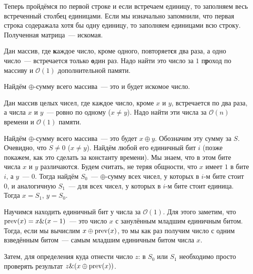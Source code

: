 \documentclass[addpoints]{exam}
\begin{document}
\begin{questions}
\begin{solution}
\begin{enumerate}
\end{enumerate}

Теперь пройдёмся по первой строке и если встречаем единицу, то заполняем весь встреченный столбец единицами. Если мы изначально запомнили, что первая строка содеражала хотя бы одну единицу, то заполняем единицами всю строку. Полученная матрица~--- искомая.

\end{solution}

\question[\half] Дан массив, где \textbf{к}аждое число, кроме одного, повторяет\textbf{с}я два раза, а одно число~--- встречается только \textbf{о}дин раз. Надо найти это число за $1$ п\textbf{р}оход по массиву и $\mathcal{O}(1)$ дополнительной памяти.

\begin{solution}

Найдём $\oplus$-сумму всего массива~--- это и будет искомое число.

\end{solution}

\question[1 \half] Дан массив целых чисел, где каждое число, кроме $x$ и $y$, встречается по два раза, а числа $x$ и $y$~--- ровно по одному ($x \neq y$). Надо найти эти числа за $\mathcal{O}(n)$ времени и $\mathcal{O}(1)$ памяти.

\begin{solution}

Найдём $\oplus$-сумму всего массива~--- это будет $x \oplus y$. Обозначим эту сумму за $S$. Очевидно, что $S \neq 0$ ($x \neq y$). Найдём любой его единичный бит $i$ (позже покажем, как это сделать за константу времени). Мы знаем, что в этом бите числа $x$ и $y$ различаются. Будем считать, не теряя общности, что $x$ имеет $1$ в бите $i$, а $y$~--- $0$. Тогда найдём $S_0$~--- $\oplus$-сумму всех чисел, у которых в $i$-м бите стоит $0$, и аналогичную $S_1$~--- для всех чисел, у которых в $i$-м бите стоит единица. Тогда $x = S_1$, $y = S_0$. 

Научимся находить единичный бит у числа за $\mathcal{O}(1)$. Для этого заметим, что $\operatorname{prev}(x) = x \& (x - 1)$~--- это число $x$ с занулённым младшим единичным битом. Тогда, если мы вычислим $x \oplus \operatorname{prev}(x)$, то мы как раз получим число с одним взведённым битом~--- самым младшим единичным битом числа $x$.

Затем, для определения куда отнести число $z$: в $S_0$ или $S_1$ необходимо просто проверять результат $z \& (x \oplus \operatorname{prev}(x))$.

\end{solution}



\end{questions}
\end{document}
